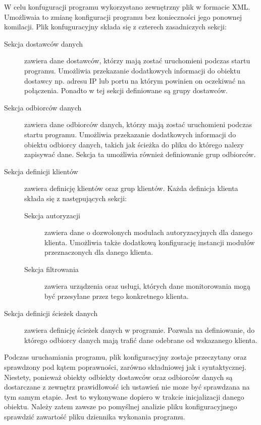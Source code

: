 W celu konfuguracji programu wykorzystano zewnętrzny plik w formacie
XML. Umożliwaia to zmianę konfiguracji programu bez konieczności jego
ponownej komilacji. Plik konfuguracyjny składa się z czterech zasadniczych sekcji:

\begin{description}
\item[Sekcja dostawców danych] zawiera dane dostawców, którzy mają
  zostać uruchomieni podczas startu programu. Umożliwia przekazanie
  dodatkowych informacji do obiektu dostawcy np. adresu IP lub portu
  na którym powinien on oczekiwać na połączenia. Ponadto w tej sekcji
  definiowane są grupy dostawców.
\item[Sekcja odbiorców danych] zawiera dane odbiorców danych, którzy
  mają zostać uruchomieni podczas startu programu. Umożliwia
  przekazanie dodatkowych informacji do obiektu odbiorcy danych,
  takich jak ścieżka do pliku do którego nalezy zapisywać dane. Sekcja
  ta umożliwia również definiowanie grup odbiorców.
\item[Sekcja definicji klientów] zawiera definicję klientów oraz grup
  klientów. Każda definicja klienta składa się z następujących sekcji:
  \begin{description}
  \item[Sekcja autoryzacji] zawiera dane o dozwolonych modułach
    autoryzacyjnych dla danego klienta. Umożliwia także dodatkową
    konfigurację instancji modułów przeznaczonych dla danego klienta.
  \item[Sekcja filtrowania] zawiera urządzenia oraz usługi, których
    dane monitorowania mogą być przesyłane przez tego konkretnego
    klienta.
  \end{description}
\item[Sekcja definicji ścieżek danych] zawiera definicję ścieżek
  danych w programie. Pozwala na definiowanie, do którego odbiorcy
  danych mają trafić dane odebrane od wskazanego klienta.
\end{description}

Podczas uruchamiania programu, plik konfiguracyjny zostaje przeczytany
oraz sprawdzony pod kątem poprawności, zarówno składniowej jak i
syntaktycznej. Niestety, ponieważ obiekty odbiekty dostawców oraz
odbiorców danych są dostarczane z zewnętrz prawidłowość ich ustawień
nie moze być sprawdzana na tym samym etapie. Jest to wykonywane
dopiero w trakcie inicjalizacji danego obiektu. Należy zatem zawsze po
pomyślnej analizie pliku konfiguracyjnego sprawdzić zawartość pliku
dziennika wykonania programu.

